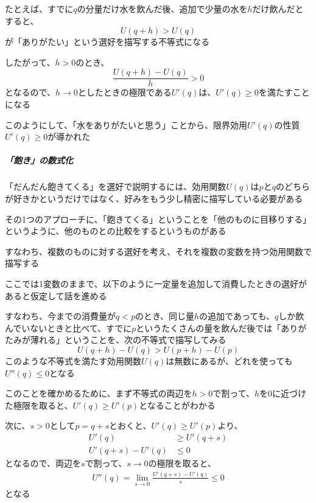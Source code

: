 \documentclass[../book_jiriki_calc]{subfiles}
\begin{document}
\br

たとえば、すでに$q$の分量だけ水を飲んだ後、追加で少量の水を$h$だけ飲んだとすると、
\begin{equation}
  U(q+h)>U(q)
\end{equation}
が「ありがたい」という選好を描写する不等式になる

したがって、$h>0$のとき、
\begin{equation}
  \frac{U(q+h)-U(q)}{h}>0
\end{equation}
となるので、$h\to 0$としたときの極限である$U'(q)$は、$U'(q) \geq 0$を満たすことになる

\br

このようにして、「水をありがたいと思う」ことから、限界効用$U'(q)$の性質$U'(q) \geq 0$が導かれた

\sectionline

\subparagraph{「飽き」の数式化}

「だんだん飽きてくる」を選好で説明するには、効用関数$U(q)$は$p$と$q$のどちらが好きかというだけではなく、好みをもう少し精密に描写している必要がある

\br

その1つのアプローチに、「飽きてくる」ということを「他のものに目移りする」というように、他のものとの比較をするというものがある

すなわち、複数のものに対する選好を考え、それを複数の変数を持つ効用関数で描写する

\br

ここでは1変数のままで、以下のように一定量を追加して消費したときの選好があると仮定して話を進める

すなわち、今までの消費量が$q<p$のとき、同じ量$h$の追加であっても、$q$しか飲んでいないときと比べて、すでに$p$というたくさんの量を飲んだ後では「ありがたみが薄れる」ということを、次の不等式で描写してみる
\begin{equation}
  U(q+h)-U(q)>U(p+h)-U(p)
\end{equation}
このような不等式を満たす効用関数$U(q)$は無数にあるが、どれを使っても$U''(q) \leq 0$となる

\br

このことを確かめるために、まず不等式の両辺を$h>0$で割って、$h$を$0$に近づけた極限を取ると、$U'(q) \geq U'(p)$となることがわかる

\br

次に、$s>0$として$p=q+s$とおくと、$U'(q) \geq U'(p)$より、
\begin{align}
  U'(q)         & \geq U'(q+s) \\
  U'(q+s)-U'(q) & \leq 0
\end{align}
となるので、両辺を$s$で割って、$s \to 0$の極限を取ると、
\begin{align}
  U''(q) = \lim_{s \to 0} \frac{U'(q+s)-U'(q)}{s} \leq 0
\end{align}
となる
\end{document}
